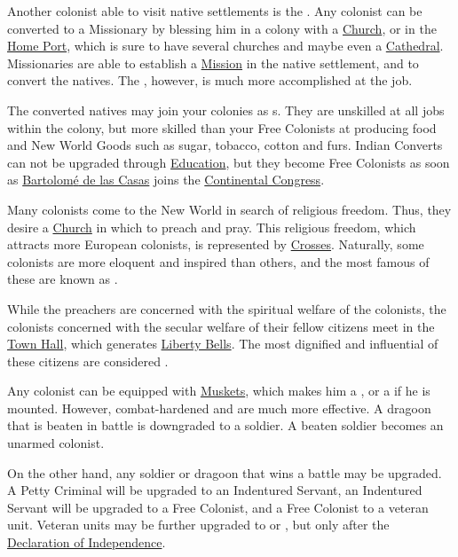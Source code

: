 \documentclass[12pt]{book}
\begin{document}
Another colonist able to visit native settlements is the
. Any colonist can be converted to a Missionary by
blessing him in a colony with a \hyperlink{Church}{Church}, or in the
\hyperlink{Home Port}{Home Port}, which is sure to have several
churches and maybe even a
\hyperlink{Cathedral}{Cathedral}. Missionaries are able to establish a
\hyperlink{Mission}{Mission} in the native settlement, and to convert
the natives. The , however, is much more
accomplished at the job.

The converted natives may join your colonies as s. They are unskilled at all jobs within the colony, but
more skilled than your Free Colonists at producing food and New World
Goods such as sugar, tobacco, cotton and furs. Indian Converts can not
be upgraded through \hyperlink{Skills and Education}{Education}, but
they become Free Colonists as soon as \hyperlink{Bartolome de las
  Casas}{Bartolom{\'e} de las Casas} joins the \hyperlink{Continental
  Congress}{Continental Congress}.

Many colonists come to the New World in search of religious
freedom. Thus, they desire a \hyperlink{Church}{Church} in which to
preach and pray. This religious freedom, which attracts more European
colonists, is represented by \hyperlink{Crosses}{Crosses}. Naturally,
some colonists are more eloquent and inspired than others, and the
most famous of these are known as .

While the preachers are concerned with the spiritual welfare of the
colonists, the colonists concerned with the secular welfare of their
fellow citizens meet in the \hyperlink{Town Hall}{Town Hall}, which
generates \hyperlink{Liberty Bells}{Liberty Bells}. The most dignified
and influential of these citizens are considered .

Any colonist can be equipped with \hyperlink{Muskets}{Muskets}, which
makes him a , or a  if he is
mounted. However, combat-hardened  and
 are much more effective. A dragoon that is
beaten in battle is downgraded to a soldier. A beaten soldier becomes
an unarmed colonist.

On the other hand, any soldier or dragoon that wins a battle may be
upgraded. A Petty Criminal will be upgraded to an Indentured Servant,
an Indentured Servant will be upgraded to a Free Colonist, and a Free
Colonist to a veteran unit. Veteran units may be further upgraded to
 or , but only after the
\hyperlink{Declaration of Independence}{Declaration of Independence}.
\end{document}
